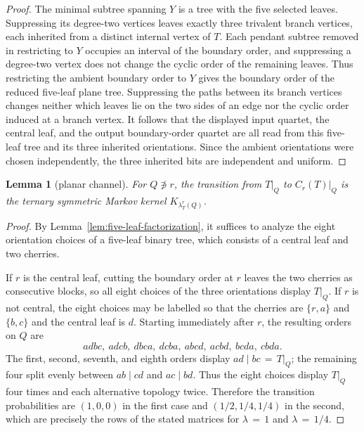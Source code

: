 \documentclass[11pt]{article}
\newtheorem{lemma}[theorem]{Lemma}
\theoremstyle{definition}
\begin{document}
\begin{proof}
The minimal subtree spanning $Y$ is a tree with the five selected leaves.
Suppressing its degree-two vertices leaves exactly three trivalent branch
vertices, each inherited from a distinct internal vertex of $T$.
Each pendant subtree removed in restricting to $Y$ occupies an interval
of the boundary order, and suppressing a degree-two vertex does not change
the cyclic order of the remaining leaves.  Thus restricting the ambient
boundary order to $Y$ gives the boundary order of the reduced five-leaf
plane tree.
Suppressing the paths between its branch vertices changes neither which
leaves lie on the two sides of an edge nor the cyclic order induced at a
branch vertex.  It follows that the displayed input quartet, the central
leaf, and the output boundary-order quartet are all read from this
five-leaf tree and its three inherited orientations.  Since the ambient
orientations were chosen independently, the three inherited bits are
independent and uniform.
\end{proof}

\begin{lemma}[planar channel]\label{lem:channel}
For $Q\not\ni r$, the transition from $T|_Q$ to $C_r(T)|_Q$ is the
ternary symmetric Markov kernel $K_{\lambda_T^r(Q)}$.
\end{lemma}

\begin{proof}
By Lemma~\ref{lem:five-leaf-factorization}, it suffices to analyze the
eight orientation choices of a five-leaf binary tree, which consists of
a central leaf and two cherries.

If $r$ is the central leaf, cutting the boundary order at $r$ leaves the
two cherries as consecutive blocks, so all eight choices of the three
orientations display $T|_Q$.  If $r$ is not central, the eight choices
may be labelled so that the cherries are $\{r,a\}$ and $\{b,c\}$ and the
central leaf is $d$.  Starting immediately after $r$, the resulting orders
on $Q$ are
\[
 adbc,\ adcb,\ dbca,\ dcba,\ abcd,\ acbd,\ bcda,\ cbda.
\]
The first, second, seventh, and eighth orders display
$ad\mid bc\,=\,T|_Q$;
the remaining four split evenly between $ab\mid cd$ and $ac\mid bd$.
Thus the eight choices display $T|_Q$ four times and each alternative
topology twice.  Therefore the
transition probabilities are $(1,0,0)$ in the first case and
$(1/2,1/4,1/4)$ in the second, which are precisely the rows of the stated
matrices for $\lambda\,=\,1$ and $\lambda\,=\,1/4$.
\end{proof}
\end{document}

